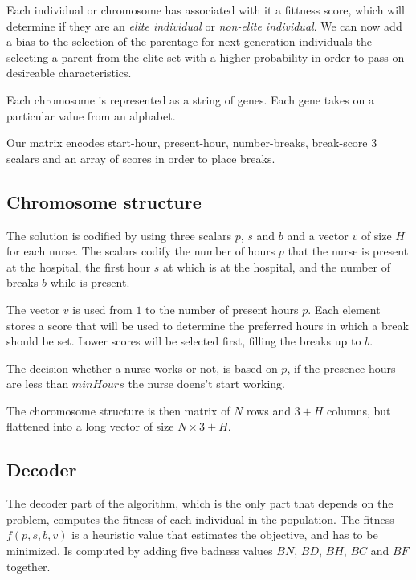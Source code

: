 \documentclass[12pt,a4paper]{article}
\begin{document}
Each individual or chromosome has associated with it a fittness score, which
will determine if they are an \textit{elite individual} or \textit{non-elite
individual}. We can now add a bias to the selection of the parentage for next
generation individuals the selecting a parent from the elite set with a higher
probability in order to pass on desireable characteristics.

Each chromosome is represented as a string of genes. Each gene takes on a
particular value from an alphabet.

Our matrix encodes start-hour, present-hour, number-breaks, break-score
3 scalars and an array of scores in order to place breaks.


\subsection{Chromosome structure}

The solution is codified by using three scalars $p$, $s$ and $b$ and a vector
$v$ of size $H$ for each nurse. The scalars codify the number of hours $p$ that
the nurse is present at the hospital, the first hour $s$ at which is at the
hospital, and the number of breaks $b$ while is present.

The vector $v$ is used from $1$ to the number of present hours $p$. Each element
stores a score that will be used to determine the preferred hours in which a
break should be set. Lower scores will be selected first, filling the breaks up
to $b$.

The decision whether a nurse works or not, is based on $p$, if the presence
hours are less than $minHours$ the nurse doens't start working.

The choromosome structure is then matrix of $N$ rows and $3+H$ columns, but
flattened into a long vector of size $N \times 3+H$.

\subsection{Decoder}

The decoder part of the algorithm, which is the only part that depends on the 
problem, computes the fitness of each individual in the population. The fitness 
$f(p,s,b,v)$ is a heuristic value that estimates the objective, and has to be 
minimized. Is computed by adding five badness values $BN$, $BD$, $BH$, $BC$ and 
$BF$ together.
\end{document}
